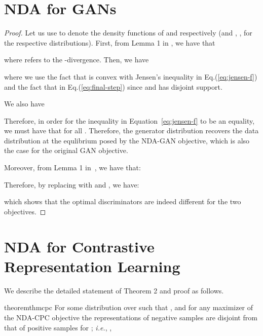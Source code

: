 \documentclass{article} \usepackage{iclr2021_conference,times}
\def\Eqref#1{Equation~\ref{#1}}
\begin{document}
\section{NDA for GANs}
\label{sec:gan-theorem}
\thmgan*
\begin{proof}

Let us use  to denote the density functions of  and  respectively (and , ,  for the respective distributions).
First, from Lemma 1 in \cite{nguyen2008estimating}, we have that 

where  refers to the -divergence.
Then, we have

 where we use the fact that  is convex with Jensen's inequality in Eq.(\ref{eq:jensen-f}) and the fact that  in Eq.(\ref{eq:final-step}) since  and  has disjoint support.
 
 We also have
 
Therefore, in order for the inequality in \Eqref{eq:jensen-f} to be an equality, we must have that  for all . Therefore, the generator distribution recovers the data distribution at the equlibrium posed by the NDA-GAN objective, which is also the case for the original GAN objective.

Moreover, from Lemma 1 in~\cite{nguyen2008estimating}, we have that:

Therefore, by replacing  with  and , we have:

which shows that the optimal discriminators are indeed different for the two objectives.
\end{proof}
\section{NDA for Contrastive Representation Learning}
\label{sec:rep-theory}

We describe the detailed statement of Theorem 2 and proof as follows.
\begin{restatable}{theorem}{thmcpc}
For some distribution  over  such that , and for any maximizer of the NDA-CPC objective 
the representations of negative samples are disjoint from that of positive samples for ; \textit{i.e.}, ,

\end{restatable}
\end{document}

